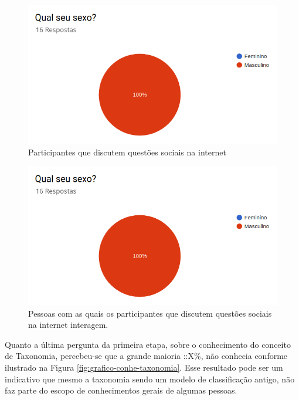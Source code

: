\begin{figure}[!ht]
    \centering
    \includegraphics[scale=0.3]{./figuras/grafico_placeholder.png}
    \caption{Participantes que discutem questões sociais na internet}
    \label{fig:grafico-discu}
\end{figure}

\begin{figure}[!ht]
    \centering
    \includegraphics[scale=0.3]{./figuras/grafico_placeholder.png}
    \caption{Pessoas com as quais os participantes que discutem questões sociais na internet interagem.}
    \label{fig:grafico-discu-alvo}
\end{figure}

\par
Quanto a última pergunta da primeira etapa, sobre o conhecimento do conceito de Taxonomia, percebeu-se que a grande maioria ::X\%, não conhecia conforme ilustrado na Figura  \ref{fig:grafico-conhe-taxonomia}. Esse resultado pode ser um indicativo que mesmo a taxonomia sendo um modelo de classificação antigo, não faz parte do escopo de conhecimentos gerais de algumas pessoas.

